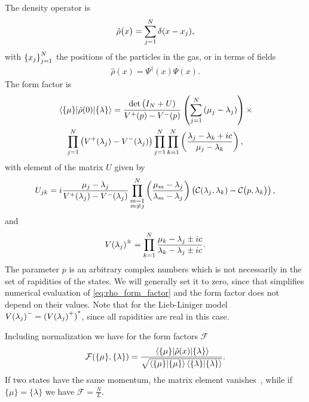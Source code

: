 \documentclass[11pt, a4paper]{report} %
\begin{document}
The density operator is~\cite{Nardis2015}
\begin{align}
  \hat{\rho}\qty\big(x) = \sum_{j=1}^N \delta\qty(x-x_j),
\end{align}
with \({\qty{x_j}}_{j=1}^N\) the positions of the particles in the gas, or in terms of fields~\cite{slavnov90_noneq_time_curren_correl_funct}
\begin{align}
  \label{eq:44}
  \hat{\rho}(x) = \Psi^{\dag}(x)\Psi(x).
\end{align}
The form factor is~\cite{slavnov90_noneq_time_curren_correl_funct, Nardis2015}
\begin{multline}
  \label{eq:rho_form_factor}
  \matrixel{\{\mu\}}{\hat{\rho}(0)}{\{\lambda\}} = \frac{\det\big(I_N +U)}{V^+(p) - V^-(p)}
  \left(\sum_{j=1}^N\qty(\mu_j-\lambda_j)\right) \times\\ \prod_{j=1}^N\left(V^+\qty(\lambda_j) - V^-\qty(\lambda_j)\right)\prod_{j=1}^N\prod_{k=1}^N\left(\frac{\lambda_j-\lambda_k+ic}{\mu_j-\lambda_k}\right),
\end{multline}
with element of the matrix \(U\) given by
\begin{align}
  U_{jk} = i \frac{\mu_j-\lambda_j}{V^+\qty(\lambda_j) -V^-\qty(\lambda_j)}\prod_{\substack{m=1\\m\neq j}}^N \left(\frac{\mu_m - \lambda_j}{\lambda_m-\lambda_j}\right) \left(\mathcal{C}\qty(\lambda_j, \lambda_k) - \mathcal{C}\qty\big(p, \lambda_k)\right),
\end{align}
and 
\begin{align}
  \label{eq:56}
  V{\qty(\lambda_j)}^{\pm} = \prod_{k=1}^N \frac{\mu_k-\lambda_j\pm ic}{\lambda_k-\lambda_j\pm ic}.
\end{align}
The parameter \(p\) is an arbitrary complex numbers which is not necessarily in the set of rapidities of the states.
We will generally set it to zero, since that simplifies numerical evaluation of \cref{eq:rho_form_factor} and the form factor does not depend on their values.
Note that for the Lieb-Liniger model \(V{\qty(\lambda_j)}^{-} = {(V{\qty(\lambda_j)}^{+})}^{*}\), since all rapidities are real in this case.

Including normalization we have for the form factors \(\mathcal{F}\)~\cite{Nardis2015}
\begin{align}
  \label{eq:21}
  \mathcal{F}(\{\mu\}, \{\lambda\}) = \frac{\matrixel{\{\mu\}}{\hat{\rho}(x)}{\{\lambda\}}}{\sqrt{\innerproduct{\{\mu\}}{\{\mu\}}\innerproduct{\{\lambda\}}{\{\lambda\}}}}.
\end{align}
If two states have the same momentum, the matrix element vanishes~\cite{slavnov90_noneq_time_curren_correl_funct}, while if $\{\mu\} = \{\lambda\}$ we have $\mathcal{F}=\frac{N}{L}$.
\end{document}
